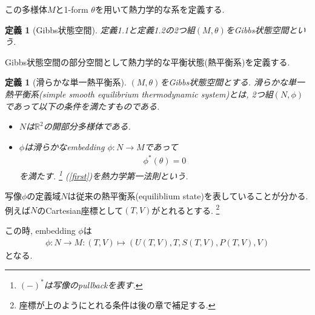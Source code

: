 \documentclass[a4paper,12pt]{ltjsarticle}
\theoremstyle{break}
\newtheorem{defn}[thm]{定義}
\newcommand{\mbr}{\mathbb{R}}
\newcommand{\mt}{\mapsto}
\numberwithin{equation}{section}
\begin{document}
この多様体$M$と1-form $\theta$を用いて熱力学的な系を定義する. 

\begin{defn}[Gibbs状態空間]
  定義1.1と定義1.2の2つ組$(M,\theta)$をGibbs状態空間という. 
\end{defn}

Gibbs状態空間の部分空間として熱力学的な平衡状態(熱平衡系)を定義する. 

\begin{defn}[滑らかな単一熱平衡系]
  $(M,\theta)$をGibbs状態空間とする. 
  滑らかな単一熱平衡系(simple smooth equilibrium thermodynamic system)とは, 2つ組$(N,\phi)$であって以下の条件を満たすものである. 
  \begin{itemize}
    \item $N$は$\mbr^2$の開部分多様体である. 
    \item $\phi$は滑らかなembedding $\phi: N \to M$であって
     \begin{align}
      \label{first}
      \phi^*(\theta)
      = 0
     \end{align}
    を満たす. 
    \footnote{
      $(-)^*$は写像のpullbackを表す. 
    }
    (\ref{first})を熱力学第一法則という. 
  \end{itemize}
\end{defn}


写像$\phi$の定義域$N$は従来の熱平衡系(equiliblium state)を表していることが分かる. 
例えば$N$のCartesian座標として$(T,V)$がとれるとする. 
\footnote{
  座標が上のようにとれる条件は後の章で補足する. 
}

この時, embedding $\phi$は
\begin{align*}
  \phi: N \to M: (T,V) \mt (U(T,V), T, S(T,V), P(T,V), V)
\end{align*}
となる. 
\end{document}
